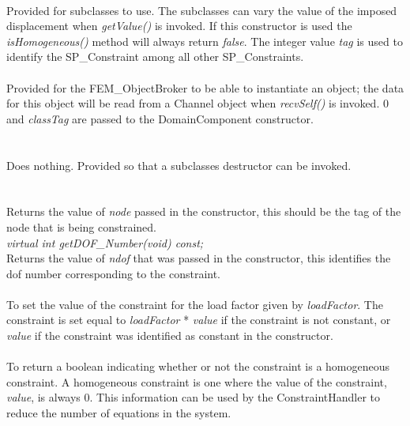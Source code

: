  \\
Provided for subclasses to use. The subclasses can vary the value of the
imposed displacement when {\em getValue()} is invoked. If this
constructor is used the {\em isHomogeneous()} method will always
return {\em false}. The integer value {\em tag} is used to identify
the SP\_Constraint among all other SP\_Constraints. \\


 \\
Provided for the FEM\_ObjectBroker to be able to instantiate an
object; the data for this object will be read from a Channel object
when {\em recvSelf()} is invoked. $0$ and {\em classTag} are passed to
the DomainComponent constructor. \\


  \\
 \\
Does nothing. Provided so that a subclasses destructor can be
invoked. \\


  \\
 \\
Returns the value of {\em node} passed in the constructor, this should be 
the tag of the node that is being constrained. \\

{\em virtual int getDOF\_Number(void) const;} \\
Returns the value of {\em ndof} that was passed in the constructor,
this identifies the dof number corresponding to the constraint. \\

\\ 
To set the value of the constraint for the load factor given by {\em
loadFactor}. The constraint is set equal to {\em loadFactor} * {\em
value} if the constraint is not constant, or {\em value} if the
constraint was identified as constant in the constructor. \\

\\
To return a boolean indicating whether or not the constraint is a
homogeneous constraint. A homogeneous constraint is one where the value
of the constraint, {\em value}, is always $0$. This information can be used by the
ConstraintHandler to reduce the number of equations in the system. \\

